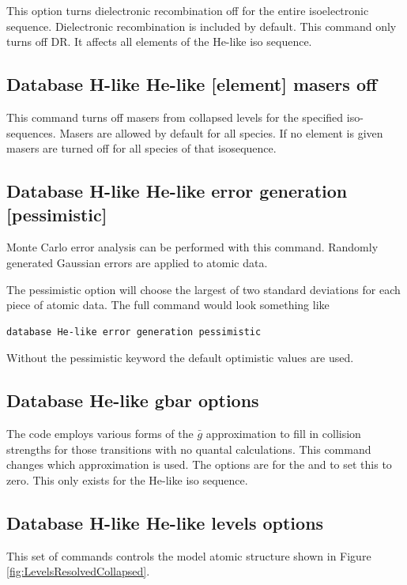 This option turns dielectronic recombination off for the entire
isoelectronic sequence.
Dielectronic recombination is included by default.
This command only turns off DR.
It affects all elements of the He-like iso sequence.

\subsection{Database H-like \OR{} He-like [element] masers off }

This command turns off masers from collapsed levels for the specified
iso-sequences. Masers are allowed by default for all species. If no 
element is given masers are turned off for all species of that isosequence.

\subsection{Database H-like \OR{} He-like error generation [pessimistic]}

Monte Carlo error analysis can be performed with this command.
Randomly
generated Gaussian errors are applied to atomic data.

The pessimistic option will choose the largest of two standard deviations
for each piece of atomic data.
The full command would look something like
\begin{verbatim}
database He-like error generation pessimistic
\end{verbatim}
Without the
pessimistic keyword the default optimistic values are used.

\subsection{Database He-like gbar options}

The code employs various forms of the $\bar g$
approximation to fill in collision strengths for those transitions with
no quantal calculations.
This command changes which approximation is used.
The options are  for the \citet{Vriens1980} and
 to set this to zero.
This only exists for the He-like iso sequence.

\subsection{Database H-like \OR{} He-like levels options}

This set of commands controls the model atomic structure shown in 
Figure \ref{fig:LevelsResolvedCollapsed}.

